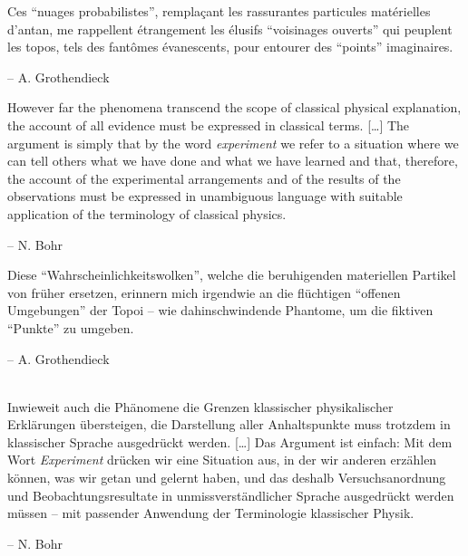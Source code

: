 \documentclass[12pt,a4paper,ngerman,landscape]{scrartcl}
\begin{document}
\Large

\begin{multicols*}{2}

Ces “nuages probabilistes”, remplaçant les rassurantes particules matérielles
d’antan, me rappellent étrangement les élusifs “voisinages ouverts” qui
peuplent les topos, tels des fantômes évanescents, pour entourer des “points”
imaginaires.

\hfill -- A. Grothendieck

\vfill


However far the phenomena transcend the scope of classical physical
explanation, the account of all evidence must be expressed in
classical terms. [\ldots] The argument is simply that by the word {\it
experiment} we refer to a situation where we can tell others what we
have done and what we have learned and that, therefore, the account of
the experimental arrangements and of the results of the observations
must be expressed in unambiguous language with suitable application of
the terminology of classical physics.

\hfill -- N. Bohr

\vfill

\columnbreak


Diese "`Wahrscheinlichkeitswolken"', welche die beruhigenden materiellen
Partikel von früher ersetzen, erinnern mich irgendwie an die flüchtigen
"`offenen Umgebungen"' der Topoi -- wie dahinschwindende Phantome, um
die fiktiven "`Punkte"' zu umgeben.

\hfill -- A. Grothendieck

\vfill

\ \\
Inwieweit auch die Phänomene die Grenzen klassischer physikalischer
Erklärungen übersteigen, die Darstellung aller Anhaltspunkte muss trotzdem
in klassischer Sprache ausgedrückt werden. [\ldots] Das Argument ist einfach:
Mit dem Wort {\it Experiment} drücken wir eine Situation aus, in der wir
anderen erzählen können, was wir getan und gelernt haben, und das deshalb
Versuchsanordnung und Beobachtungsresultate in
unmissverständlicher Sprache ausgedrückt werden müssen -- mit passender
Anwendung der Terminologie klassischer Physik.

\hfill -- N. Bohr
\end{multicols*}
\end{document}
